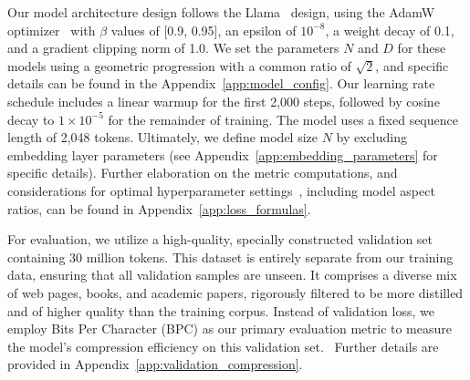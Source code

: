 \documentclass{article}
\begin{document}
Our model architecture design follows the Llama~\cite{Touvron2023a,Grattafiori2024} design, using the AdamW optimizer~\cite{loshchilov2018decoupled} with \(\beta\) values of [0.9, 0.95], an epsilon of \(10^{-8}\), a weight decay of 0.1, and a gradient clipping norm of 1.0. 
We set the parameters $N$ and $D$ for these models using a geometric progression with a common ratio of $\sqrt{2}$, and specific details can be found in the Appendix~\ref{app:model_config}.
Our learning rate schedule includes a linear warmup for the first 2,000 steps, followed by cosine decay to \(1 \times 10^{-5}\) for the remainder of training.
The model uses a fixed sequence length of 2,048 tokens.
Ultimately, we define model size $N$ by excluding embedding layer parameters (see Appendix~\ref{app:embedding_parameters} for specific details).
Further elaboration on the metric computations, and considerations for optimal hyperparameter settings~\cite{li2025predictable}, including model aspect ratios, can be found in Appendix~\ref{app:loss_formulas}.

For evaluation, we utilize a high-quality, specially constructed validation set containing 30 million tokens. This dataset is entirely separate from our training data, ensuring that all validation samples are unseen. It comprises a diverse mix of web pages, books, and academic papers, rigorously filtered to be more distilled and of higher quality than the training corpus. Instead of validation loss, we employ Bits Per Character (BPC) as our primary evaluation metric to measure the model's compression efficiency on this validation set. ~Further details are provided in Appendix~\ref{app:validation_compression}.

\end{document}

